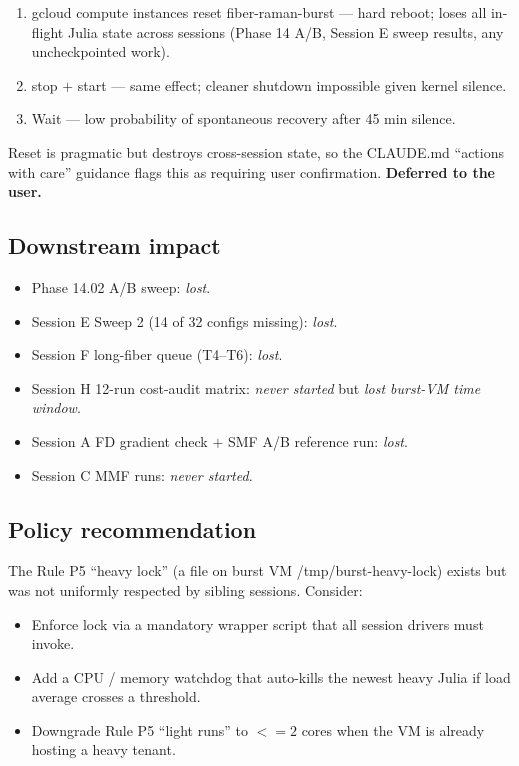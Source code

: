 \documentclass[11pt,letterpaper]{article}
\def\leq{<=}%
\def\texttt#1{#1}%
\begin{document}
\begin{enumerate}[leftmargin=*]
  \item \texttt{gcloud compute instances reset fiber-raman-burst} --- hard reboot; loses all in-flight Julia state across sessions (Phase 14 A/B, Session E sweep results, any uncheckpointed work).
  \item \texttt{stop} $+$ \texttt{start} --- same effect; cleaner shutdown impossible given kernel silence.
  \item Wait --- low probability of spontaneous recovery after 45 min silence.
\end{enumerate}

Reset is pragmatic but destroys cross-session state, so the CLAUDE.md ``actions with care'' guidance flags this as requiring user confirmation. \textbf{Deferred to the user.}

\subsection{Downstream impact}

\begin{itemize}[leftmargin=*]
  \item Phase 14.02 A/B sweep: \emph{lost}.
  \item Session E Sweep 2 (14 of 32 configs missing): \emph{lost}.
  \item Session F long-fiber queue (T4--T6): \emph{lost}.
  \item Session H 12-run cost-audit matrix: \emph{never started} but \emph{lost burst-VM time window}.
  \item Session A FD gradient check $+$ SMF A/B reference run: \emph{lost}.
  \item Session C MMF runs: \emph{never started}.
\end{itemize}

\subsection{Policy recommendation}

The Rule P5 ``heavy lock'' (a file on burst VM \texttt{/tmp/burst-heavy-lock}) exists but was not uniformly respected by sibling sessions. Consider:
\begin{itemize}[leftmargin=*]
  \item Enforce lock via a mandatory wrapper script that all session drivers must invoke.
  \item Add a CPU / memory watchdog that auto-kills the newest heavy Julia if load average crosses a threshold.
  \item Downgrade Rule P5 ``light runs'' to $\leq 2$ cores when the VM is already hosting a heavy tenant.
\end{itemize}
\end{document}
